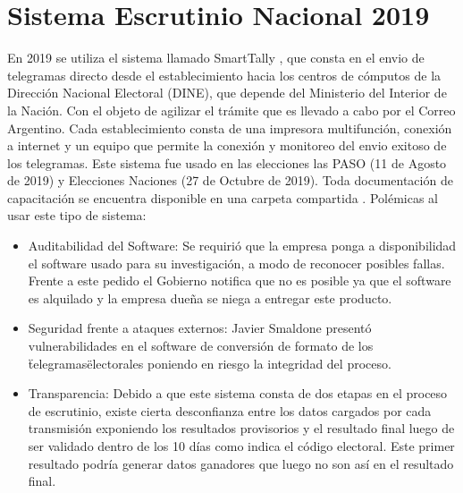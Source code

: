 \section{Sistema Escrutinio Nacional 2019}
En 2019 se utiliza el sistema llamado SmartTally \cite{smartally} , que consta en el envio de telegramas directo desde el establecimiento hacia los centros de cómputos de la Dirección Nacional Electoral (DINE), que depende del Ministerio del Interior de la Nación. Con el objeto de agilizar el trámite que es llevado a cabo por el Correo Argentino. Cada establecimiento consta de una impresora multifunción, conexión a internet y un equipo que permite la conexión y monitoreo del envio exitoso de los telegramas. \newline
Este sistema fue usado en las elecciones las PASO (11 de Agosto de 2019) y Elecciones Naciones (27 de Octubre de 2019). Toda documentación de capacitación se encuentra disponible en una carpeta compartida \cite{manualesCorreoArg}.\newline
Polémicas al usar este tipo de sistema:
\begin{itemize}
    \item Auditabilidad del Software: Se requirió que la empresa ponga a disponibilidad el software usado para su investigación, a modo de reconocer posibles fallas. Frente a este pedido el Gobierno notifica que no es posible ya que el software es alquilado y la empresa dueña se niega a entregar este producto.\cite{auditabilidadSmartmatic}
    \item Seguridad frente a ataques externos: Javier Smaldone presentó vulnerabilidades en el software de conversión de formato de los \"telegramas\" electorales poniendo en riesgo la integridad del proceso. \cite{seguridadSmartmatic}
    \item Transparencia: Debido a que este sistema consta de dos etapas en el proceso de escrutinio, existe cierta desconfianza entre los datos cargados por cada transmisión exponiendo los resultados provisorios y el resultado final luego de ser validado dentro de los 10 días como indica el código electoral. Este primer resultado podría generar datos ganadores que luego no son así en el resultado final. \cite{rnEscrutinioProvisorio}
\end{itemize}
